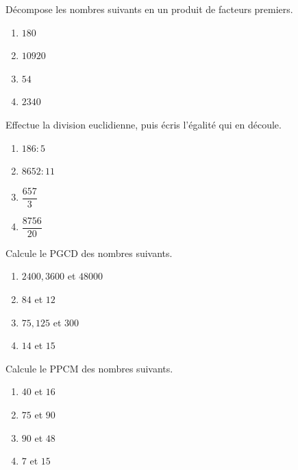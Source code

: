 \documentclass[12pt,parskip=half-, twoside=semi]{scrartcl}
\begin{document}
\setcounter{exercise}{0}
      
      \begin{exercise}
        Décompose les nombres suivants en un produit de facteurs premiers.
          \begin{enumerate}[cols=4]
            \item $180$
            \item $10 920$
            \item $54$
            \item $2340$
          \end{enumerate}
      \end{exercise}
      
      \begin{exercise}
        Effectue la division euclidienne, puis écris l'égalité qui en découle. 
          \begin{enumerate}[cols=2]
            \item $186 : 5$
            \item $8652 : 11$
            \item $\dfrac{657}{3}$
            \item $\dfrac{8756}{20}$
          \end{enumerate}
      \end{exercise}
      
      \begin{exercise}
        Calcule le PGCD des nombres suivants. 
          \begin{enumerate}[cols=2]
            \item $2400, 3600$ et $48000$
            \item $84$ et $12$
            \item $75, 125$ et $300$
            \item $14$ et $15$
          \end{enumerate}
      \end{exercise}
      
      \begin{exercise}
        Calcule le PPCM des nombres suivants.
          \begin{enumerate}[cols=2]
            \item $40$ et $16$
            \item $75$ et $90$
            \item $90$ et $48$
            \item $7$ et $15$
          \end{enumerate}
      \end{exercise}
      
\end{document}
